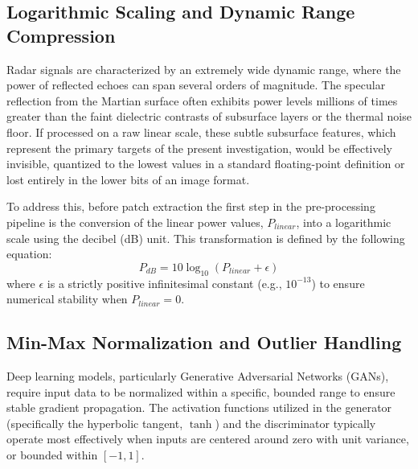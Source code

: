 \subsection{Logarithmic Scaling and Dynamic Range Compression}
Radar signals are characterized by an extremely wide dynamic range, where the power of reflected echoes can span several orders of magnitude.
The specular reflection from the Martian surface often exhibits power levels millions of times greater than the faint dielectric contrasts of subsurface layers or the thermal noise floor.
If processed on a raw linear scale, these subtle subsurface features, which represent the primary targets of the present investigation, would be effectively invisible, quantized to the lowest values in a standard floating-point definition or lost entirely in the lower bits of an image format.

To address this, before patch extraction the first step in the pre-processing pipeline is the conversion of the linear power values, $P_{linear}$, into a logarithmic scale using the decibel (dB) unit.
This transformation is defined by the following equation:
$$ P_{dB} = 10 \log_{10}(P_{linear} + \epsilon) $$
where $\epsilon$ is a strictly positive infinitesimal constant (e.g., $10^{-13}$) to ensure numerical stability when $P_{linear} = 0$.

\subsection{Min-Max Normalization and Outlier Handling}
\label{subsec:minmax_normalization}
Deep learning models, particularly Generative Adversarial Networks (GANs), require input data to be normalized within a specific, bounded range to ensure stable gradient propagation.
The activation functions utilized in the generator (specifically the hyperbolic tangent, $\tanh$) and the discriminator typically operate most effectively when inputs are centered around zero with unit variance, or bounded within $[-1, 1]$.

